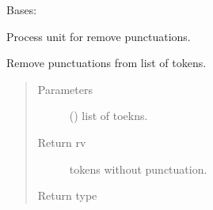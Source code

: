 \documentclass[letterpaper,10pt,english]{sphinxmanual}
\begin{document}

\begin{fulllineitems}
\label{\detokenize{matchzoo:matchzoo.preprocessors.PuncRemovalUnit}}
Bases: {\hyperref[\detokenize{matchzoo:matchzoo.preprocessors.ProcessorUnit}]{}}

Process unit for remove punctuations.

\begin{fulllineitems}
\label{\detokenize{matchzoo:matchzoo.preprocessors.PuncRemovalUnit.transform}}
Remove punctuations from list of tokens.
\begin{quote}\begin{description}
\item[{Parameters}] \leavevmode
{} () \textendash{} list of toekns.

\item[{Return rv}] \leavevmode
tokens  without punctuation.

\item[{Return type}] \leavevmode
{}

\end{description}\end{quote}

\end{fulllineitems}


\end{fulllineitems}

\end{document}
